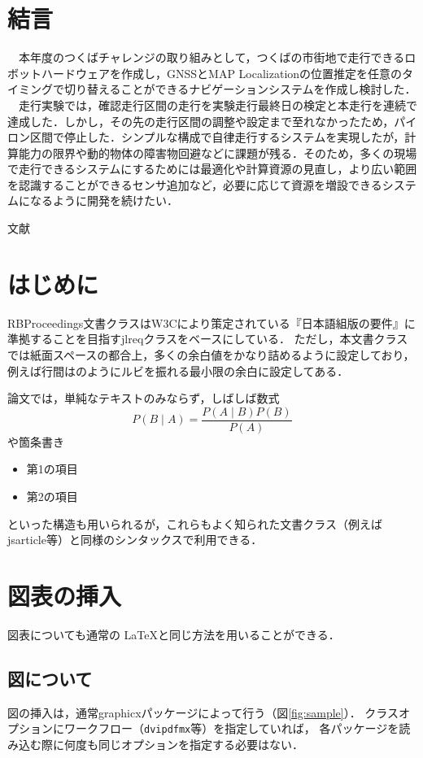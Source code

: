 \documentclass[platex,dvipdfmx]{rbproceedings}
\newcommand{\pkg}[1]{\textsf{#1}}
\newcommand{\code}[1]{\texttt{#1}}
\begin{document}
\section{結言}
　本年度のつくばチャレンジの取り組みとして，つくばの市街地で走行できるロボットハードウェアを作成し，GNSSとMAP Localizationの位置推定を任意のタイミングで切り替えることができるナビゲーションシステムを作成し検討した．
　走行実験では，確認走行区間の走行を実験走行最終日の検定と本走行を連続で達成した．しかし，その先の走行区間の調整や設定まで至れなかったため，パイロン区間で停止した．シンプルな構成で自律走行するシステムを実現したが，計算能力の限界や動的物体の障害物回避などに課題が残る．そのため，多くの現場で走行できるシステムにするためには最適化や計算資源の見直し，より広い範囲を認識することができるセンサ追加など，必要に応じて資源を増設できるシステムになるように開発を続けたい．

文献



\section{はじめに}
\pkg{RBProceedings}文書クラスはW3Cにより策定されている『日本語組版の要件』\cite{JLREQ}に準拠することを目指す\pkg{jlreq}クラスをベースにしている．
ただし，本文書クラスでは紙面スペースの都合上，多くの余白値をかなり詰めるように設定しており，例えば行間はのようにルビを振れる最小限の余白に設定してある．

論文では，単純なテキストのみならず，しばしば数式
\begin{equation}
P(B\mid A) = \frac{P(A\mid B)P(B)}{P(A)}
\end{equation}
や箇条書き
\begin{itemize}
\item 第1の項目
\item 第2の項目
\end{itemize}
といった構造も用いられるが，これらもよく知られた文書クラス（例えば\pkg{jsarticle}等）と同様のシンタックスで利用できる．

\section{図表の挿入}
図表についても通常の \LaTeX と同じ方法を用いることができる．

\subsection{図について}
図の挿入は，通常\pkg{graphicx}パッケージによって行う（図\ref{fig:sample}）．
クラスオプションにワークフロー（\code{dvipdfmx}等）を指定していれば，
各パッケージを読み込む際に何度も同じオプションを指定する必要はない．
\end{document}
